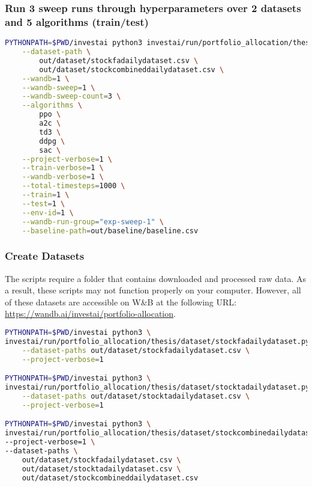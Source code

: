 \documentclass[../xlapes02]{subfiles}
\begin{document}
    \subsubsection{Run 3 sweep runs through hyperparameters over 2 datasets and 5 algorithms (train/test)}
    \begin{lstlisting}[language=bash]
PYTHONPATH=$PWD/investai python3 investai/run/portfolio_allocation/thesis/train.py \
    --dataset-path \
        out/dataset/stockfadailydataset.csv \
        out/dataset/stockcombineddailydataset.csv \
    --wandb=1 \
    --wandb-sweep=1 \
    --wandb-sweep-count=3 \
    --algorithms \
        ppo \
        a2c \
        td3 \
        ddpg \
        sac \
    --project-verbose=1 \
    --train-verbose=1 \
    --wandb-verbose=1 \
    --total-timesteps=1000 \
    --train=1 \
    --test=1 \
    --env-id=1 \
    --wandb-run-group="exp-sweep-1" \
    --baseline-path=out/baseline/baseline.csv
    \end{lstlisting}

    \subsubsection{Create Datasets}
    The scripts require a folder that contains downloaded and processed raw data. As a result, these scripts may not function properly on your computer. However, all of these datasets are accessible on W\&B at the following URL: \url{https://wandb.ai/investai/portfolio-allocation}.
    \begin{lstlisting}[language=bash]
PYTHONPATH=$PWD/investai python3 \
investai/run/portfolio_allocation/thesis/dataset/stockfadailydataset.py \
    --dataset-paths out/dataset/stockfadailydataset.csv \
    --project-verbose=1

PYTHONPATH=$PWD/investai python3 \
investai/run/portfolio_allocation/thesis/dataset/stocktadailydataset.py \
    --dataset-paths out/dataset/stocktadailydataset.csv \
    --project-verbose=1

PYTHONPATH=$PWD/investai python3 \
investai/run/portfolio_allocation/thesis/dataset/stockcombinedailydataset.py \
--project-verbose=1 \
--dataset-paths \
    out/dataset/stockfadailydataset.csv \
    out/dataset/stocktadailydataset.csv \
    out/dataset/stockcombineddailydataset.csv
    \end{lstlisting}
\end{document}
